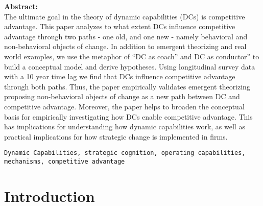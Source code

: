 \documentclass[review,fleqn]{elsarticle}\usepackage[]{graphicx}\usepackage[]{color}
\begin{document}
{\bf Abstract:}\\
  The ultimate goal in the theory of dynamic capabilities (DCs) is competitive advantage.
  This paper analyzes to what extent DCs influence competitive advantage through two paths
  - one old, and one new - namely behavioral and non-behavioral objects of change.  In
  addition to emergent theorizing and real world examples, we use the metaphor of “DC as
  coach” and DC as conductor” to build a conceptual model and derive hypotheses.  Using
  longitudinal survey data with a 10 year time lag we find that DCs influence competitive
  advantage through both paths. Thus, the paper empirically validates emergent theorizing
  proposing non-behavioral objects of change as a new path between DC and competitive
  advantage. Moreover, the paper helps to broaden the conceptual basis for empirically
  investigating how DCs enable competitive advantage. This has implications for
  understanding how dynamic capabilities work, as well as practical implications for how
  strategic change is implemented in firms.


\begin{keyword}
\texttt{Dynamic Capabilities, strategic cognition, operating capabilities, mechanisms,
  competitive advantage }
\end{keyword}







\section*{Introduction}





\end{document}
